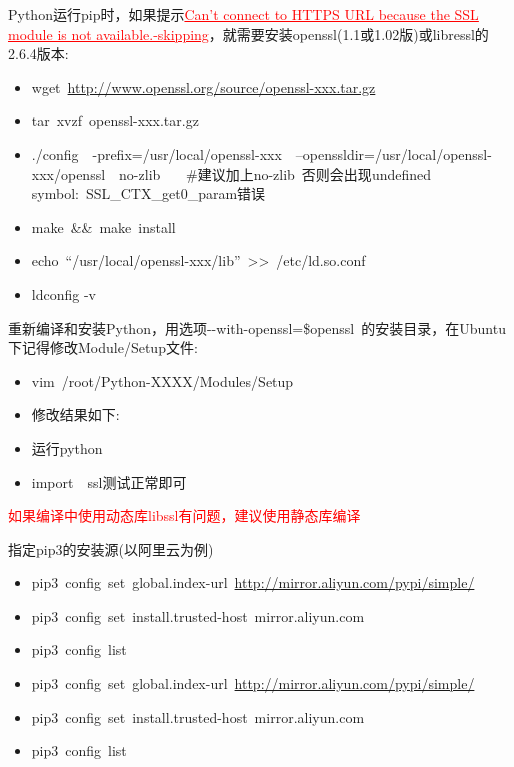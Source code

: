 \documentclass[10pt,a4paper]{article}
\begin{document}
\textrm{Python}运行\textrm{pip}时，如果提示\textcolor{red}{\underline{\textrm{Can't connect to HTTPS URL because the SSL module is not available.-skipping}}}，就需要安装\textrm{openssl}(1.1或1.02版)或\textrm{libressl}的2.6.4版本:
\begin{itemize}
	\item \textrm{wget~\url{http://www.openssl.org/source/openssl-xxx.tar.gz}}
	\item \textrm{tar~xvzf~openssl-xxx.tar.gz}
	\item \textrm{./config~~-prefix=/usr/local/openssl-xxx~~--openssldir=/usr/local/openssl-xxx/openssl~~no-zlib} ~~~\#建议加上\textrm{no-zlib}~否则会出现\textrm{undefined symbol:~SSL\_CTX\_get0\_param}错误
	\item \textrm{make~\&\&~make~install}
	\item \textrm{echo~``/usr/local/openssl-xxx/lib''~>>~/etc/ld.so.conf}
	\item \textrm{ldconfig -v}
\end{itemize}
重新编译和安装\textrm{Python}，用选项\textrm{-\/-with-openssl=\$openssl~}的安装目录，在\textrm{Ubuntu}下记得修改\textrm{Module/Setup}文件:~
\begin{itemize}
	\item \textrm{vim~/root/Python-XXXX/Modules/Setup}
	\item 修改结果如下:\\
    \item 运行\textrm{python}
    \item \textrm{import~~ssl}测试正常即可
\end{itemize}
\textcolor{red}{如果编译中使用动态库\textrm{libssl}有问题，建议使用静态库编译}

指定\textrm{pip3}的安装源(以阿里云为例)\\
\begin{itemize}
	\item \textrm{pip3~config~set~global.index-url~\url{http://mirror.aliyun.com/pypi/simple/}}
	\item \textrm{pip3~config~set~install.trusted-host~mirror.aliyun.com}
	\item \textrm{pip3~config~list}
	\item \textrm{pip3~config~set~global.index-url~\url{http://mirror.aliyun.com/pypi/simple/}}
	\item \textrm{pip3~config~set~install.trusted-host~mirror.aliyun.com}
	\item \textrm{pip3~config~list}
\end{itemize}
\end{document}
